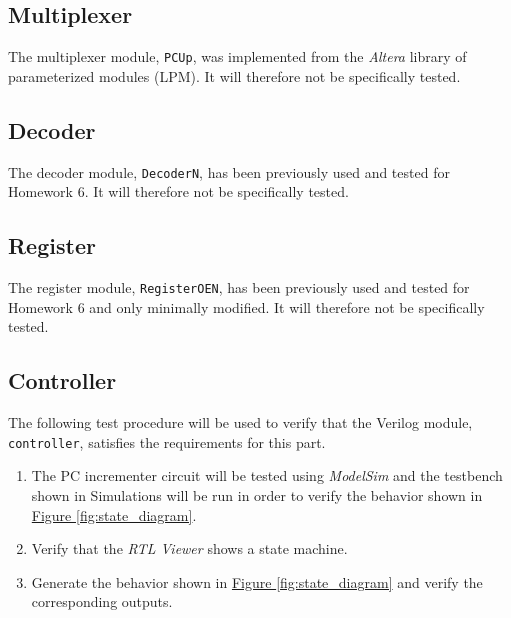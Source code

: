 \subsection{Multiplexer} %
\label{sub:multiplexer}

The multiplexer module, \verb|PCUp|, was implemented from the \emph{Altera} library of parameterized modules (LPM).
It will therefore not be specifically tested.


\subsection{Decoder} %
\label{sub:decoder}

The decoder module, \verb|DecoderN|, has been previously used and tested for Homework 6.
It will therefore not be specifically tested.

\subsection{Register} %
\label{sub:register}

The register module, \verb|RegisterOEN|, has been previously used and tested for Homework 6 and only minimally modified.
It will therefore not be specifically tested.

\subsection{Controller} %
\label{sub:controller_pro}

The following test procedure will be used to verify that the Verilog module, \verb|controller|, satisfies the requirements for this part.

\begin{enumerate}
    \item The PC incrementer circuit will be tested using \emph{ModelSim} and the testbench shown in %
    Simulations will be run in order to verify the behavior shown in
    \hyperref[fig:state_diagram]{Figure \ref*{fig:state_diagram}}.
    \item Verify that the \emph{RTL Viewer} shows a state machine.
    \item Generate the behavior shown in \hyperref[fig:state_diagram]{Figure \ref*{fig:state_diagram}} and verify the corresponding outputs.
\end{enumerate}

